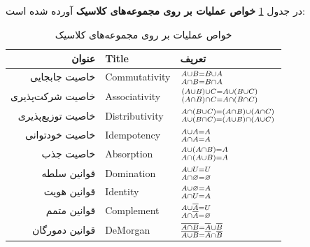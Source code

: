  در جدول
\ref{table:t_classic_properties}
\textbf{خواص عملیات بر روی مجموعه‌های کلاسیک} 
آورده شده‌ است:
\begin{table}[!htbp]
	{\normalsize
		\begin{center}
			\begin{tabular}{r l l} \hline
				عنوان & Title & تعریف  
				\\\hline 
	خاصیت جابجایی &
				Commutativity &
				 $ A \cup B = B \cup A \atop
				 A \cap B = B \cap A $
				\\
			خاصیت شرکت‌پذیری &
			   Associativity &
				$(A \cup B) \cup C = A \cup (B \cup C) \atop
				(A \cap B) \cap C = A \cap (B \cap C) $ 
				\\
				خاصیت توزیع‌پذیری &
				Distributivity &
				$A \cap (B \cup C) = (A \cap B) \cup (A \cap C) \atop
				A \cup (B \cap C) = (A \cup B) \cap (A \cup C)$
				\\
				خاصیت خودتوانی &
				Idempotency &
				$ A \cup A = A \atop
				A \cap A = A$ 
				\\
				خاصیت جذب & 
				Absorption &
				$ A \cup (A \cap B) = A \atop
				 A \cap (A \cup B) = A$ 
				\\
				قوانین سلطه&
			    Domination &
				$ A \cup U = U \atop
			    A \cap \varnothing = \varnothing $ 
				\\
				قوانین هویت &
				Identity &
				$ A \cup \varnothing = A  \atop
				 A \cap U = A $
				\\
				قوانین متمم &
				Complement &
				$ A \cup \overline{A} = U \atop
				 A \cap \overline{A} = \varnothing $
				\\
			قوانین دمورگان &
		    	DeMorgan&
				$ \overline{A \cap B} = \overline{A} \cup \overline{B} \atop
				\overline{A \cup B} = \overline{A} \cap \overline{B} $ 
				\\\hline
\end{tabular}
\caption{خواص عملیات بر روی مجموعه‌های کلاسیک}
\label{table:t_classic_properties}
\end{center}
}
\end{table} 				
\\
